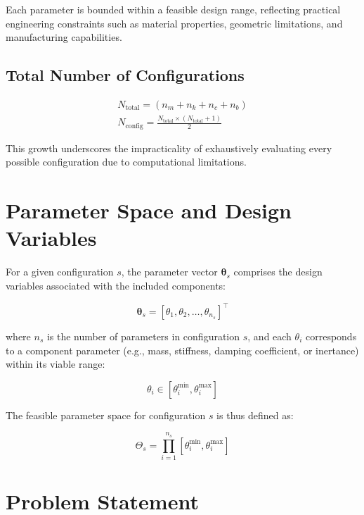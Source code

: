 \documentclass[12pt,a4paper]{article}
\begin{document}
Each parameter is bounded within a feasible design range, reflecting practical engineering constraints such as material properties, geometric limitations, and manufacturing capabilities.

\subsection{Total Number of Configurations}



\begin{align}
N_{\text{total}} = \left( n_m + n_k + n_c + n_b \right)\\
N_{\text{config}} = \frac{N_{\text{total}} \times (N_{\text{total}} + 1)}{2}
\label{eq:N_config}
\end{align}

This growth underscores the impracticality of exhaustively evaluating every possible configuration due to computational limitations.


\section{Parameter Space and Design Variables}

For a given configuration $s$, the parameter vector $\boldsymbol{\theta}_s$ comprises the design variables associated with the included components:

\begin{equation}
\boldsymbol{\theta}_s = [ \theta_1, \theta_2, \ldots, \theta_{n_s} ]^\top
\label{eq:theta_s}
\end{equation}

where $n_s$ is the number of parameters in configuration $s$, and each $\theta_i$ corresponds to a component parameter (e.g., mass, stiffness, damping coefficient, or inertance) within its viable range:

\begin{equation}
\theta_i \in [ \theta_i^{\min}, \theta_i^{\max} ]
\label{eq:theta_i_range}
\end{equation}

The feasible parameter space for configuration $s$ is thus defined as:

\begin{equation}
\Theta_s = \prod_{i=1}^{n_s} [ \theta_i^{\min}, \theta_i^{\max} ]
\label{eq:Theta_s}
\end{equation}




\section{Problem Statement}
\end{document}
